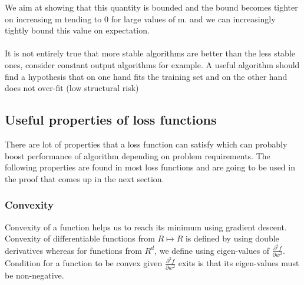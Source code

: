 \documentclass[12pt]{article}
\begin{document}
We aim at showing that this quantity is bounded and the bound becomes tighter on increasing m tending to 0 for large values of m. 
\noindent and we can increasingly tightly bound this value on expectation.\\
\\
It is not entirely true that more stable  algorithms are better than the less stable ones, consider constant output algorithms for example. A useful algorithm should find a hypothesis that on one hand fits the training set and on the other hand does not over-fit (low structural risk)
\newpage
\subsection{Useful properties of loss functions}
There are lot of properties that a loss function can satisfy which can probably boost performance of algorithm depending on problem requirements.
The following properties are found in most loss functions and are going to be used in the proof that comes up in the next section.

\subsubsection{Convexity}
Convexity of a function helps us to reach its minimum using gradient descent. Convexity of differentiable functions from $R \mapsto R$ is defined by using double derivatives whereas for functions from $R^d$, we define using eigen-values of $\frac{\partial^2 f}{\partial w^2}$.\\
\hfill \break
Condition for a function to be convex given $\frac{\partial^2 f}{\partial w^2}$ exits is that its eigen-values must be non-negative.\\

\noindent{}
\end{document}
